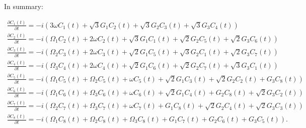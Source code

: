\documentclass{article}
\theoremstyle{definition}
\begin{document}
In summary:

\begin{gather*}
    \frac{\partial C_{1}(t)}{\partial t} = -i(3 \omega C_{1}(t) + \sqrt{3} G_{1} C_{2}(t) + \sqrt{3} G_{2} C_{3}(t) + \sqrt{3} G_{3}C_{4}(t))\\
    \frac{\partial C_{2}(t)}{\partial t} = -i(\Omega_{1}C_{2}(t) + 2 \omega C_{2}(t) + \sqrt{3} G_{1}C_{1}(t) + \sqrt{2} G_{2}C_{5}(t) + \sqrt{2} G_{3}C_{6}(t))\\
    \frac{\partial C_{3}(t)}{\partial t} = -i(\Omega_{2}C_{3}(t) + 2 \omega C_{3}(t) + \sqrt{2} G_{1}C_{5}(t) + \sqrt{3} G_{2}C_{1}(t) + \sqrt{2} G_{3}C_{7}(t))\\
   \frac{\partial C_{4}(t)}{\partial t} = -i(\Omega_{3}C_{4}(t) + 2 \omega C_{4}(t) + \sqrt{2} G_{1}C_{6}(t) + \sqrt{2} G_{2}C_{7}(t) + \sqrt{3} G_{3}C_{1}(t))\\
    \frac{\partial C_{5}(t)}{\partial t} = -i(\Omega_{1}C_{5}(t) + \Omega_{2}C_{5}(t) + \omega C_{5}(t) + \sqrt{2} G_{1}C_{3}(t) + \sqrt{2} G_{2}C_{2}(t) + G_{3}C_{8}(t))\\
    \frac{\partial C_{6}(t)}{\partial t} = -i(\Omega_{1}C_{6}(t) + \Omega_{3}C_{6}(t) + \omega C_{6}(t) + \sqrt{2} G_{1}C_{4}(t) + G_{2}C_{8}(t) + \sqrt{2} G_{3}C_{2}(t))\\
    \frac{\partial C_{7}(t)}{\partial t} = -i(\Omega_{2}C_{7}(t) + \Omega_{3}C_{7}(t) + \omega C_{7}(t) + G_{1}C_{8}(t) + \sqrt{2} G_{2}C_{4}(t) + \sqrt{2} G_{3}C_{3}(t))\\
    \frac{\partial C_{8}(t)}{\partial t} = -i(\Omega_{1}C_{8}(t) + \Omega_{2}C_{8}(t) + \Omega_{3}C_{8}(t) + G_{1}C_{7}(t) + G_{2}C_{6}(t) + G_{3}C_{5}(t)).
\end{gather*}
\end{document}
